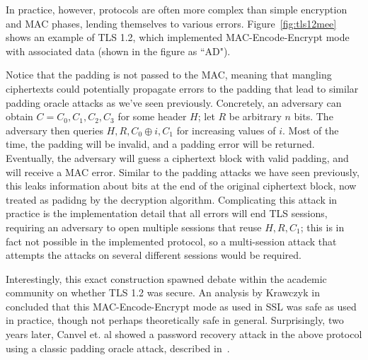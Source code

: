 In practice, however, protocols are often more complex than simple encryption and MAC phases, lending themselves to various errors.  
Figure~\ref{fig:tls12mee} shows an example of TLS 1.2, which implemented MAC-Encode-Encrypt mode with associated data (shown in the figure as ``AD").

Notice that the padding is not passed to the MAC, meaning that mangling ciphertexts could potentially propagate errors to the padding that lead to 
similar padding oracle attacks as we've seen previously.  Concretely, an adversary can obtain $C = C_0,C_1,C_2,C_3$ for some header $H$; let $R$ be 
arbitrary $n$ bits.  The adversary then queries $H, R, C_0 \oplus i, C_1$ for increasing values of $i$.  Most of the time, the padding will be 
invalid, and a padding error will be returned.  Eventually, the adversary will guess a ciphertext block with valid padding, and will receive a MAC 
error.  Similar to the padding attacks we have seen previously, this leaks information about bits at the end of the original ciphertext block, now 
treated as padidng by the decryption algorithm.  Complicating this attack in practice is the implementation detail that all errors will end TLS 
sessions, requiring an adversary to open multiple sessions that reuse $H, R, C_1$; this is in fact not possible in the implemented protocol, so a 
multi-session attack that attempts the attacks on several different sessions would be required.

Interestingly, this exact construction spawned debate within the academic community on whether TLS 1.2 was secure.  An analysis by Krawczyk 
in~\cite{Krawczyk2001} concluded that this MAC-Encode-Encrypt mode as used in SSL was safe as used in practice, though not perhaps theoretically safe 
in general. Surprisingly, two years later, Canvel et. al showed a password recovery attack in the above protocol using a classic padding oracle 
attack, described in~\cite{Canvel2003}.


